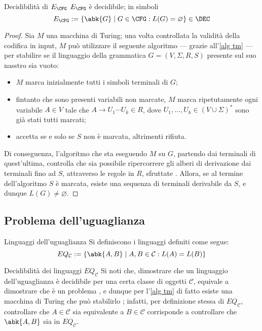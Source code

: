 \documentclass[a4paper, 12pt]{report}
\begin{document}
    \begin{framedthm}{Decidibilità di $E_\CFG$}
        $E_\CFG$ è decidibile; in simboli $$E_\CFG := \{\abk{G} \mid G \in \CFG: L(G) = \varnothing \} \in \DEC$$
    \end{framedthm}

    \begin{proof}
        Sia $M$ una macchina di Turing; una volta controllata la validità della codifica in input, $M$ può utilizzare il seguente algoritmo --- grazie all'\cref{alg tm} --- per stabilire se il linguaggio della grammatica $G = (V, \Sigma, R, S)$ presente sul suo nasstro sia vuoto:

        \begin{itemize}
            \item $M$ marca inizialmente tutti i simboli terminali di $G$;
            \item fintanto che sono presenti variabili non marcate, $M$ marca ripetutamente ogni variabile $A \in V$ tale che $A \to U_1 \cdots U_k \in R$, dove $U_1, \ldots, U_k \in (V \cup \Sigma)^*$ sono già stati tutti marcati;
            \item accetta se e solo se $S$ non è marcata, altrimenti rifiuta.
        \end{itemize}

        Di conseguenza, l'algoritmo che sta eseguendo $M$ su $G$, partendo dai terminali di quest'ultima, controlla che sia possibile ripercorrere gli alberi di derivazione dai terminali fino ad $S$, attraverso le regole in $R$, sfruttate . Allora, se al termine dell'algoritmo $S$ è marcata, esiste una sequenza di terminali derivabile da $S$, e dunque $L(G) \neq \varnothing$.
    \end{proof}

    \subsection{Problema dell'uguaglianza}

    \begin{frameddefn}{Linguaggi dell'uguaglianza}
        Si definiscono  i linguaggi definiti come segue: $$EQ_\mathcal{C} := \{\abk{A, B} \mid A, B \in \mathcal{C} : L(A) = L(B)\}$$
    \end{frameddefn}

    \begin{framedobs}{Decidibilità dei linguaggi $EQ_\mathcal C$}
        Si noti che, dimostrare che un linguaggio dell'uguaglianza è decidibile per una certa classe di oggetti $\mathcal{C}$, equivale a dimostrare che  è un problema , e dunque per l'\cref{alg tm} di fatto esiste una macchina di Turing che può stabilirlo ; infatti, per definizione stessa di $EQ_\mathcal C$, controllare che $A \in \mathcal{C}$ sia equivalente a $B \in \mathcal C$ corrisponde a controllare che $\abk{A,B}$ sia in $EQ_\mathcal{C}$.
    \end{framedobs}
\end{document}
